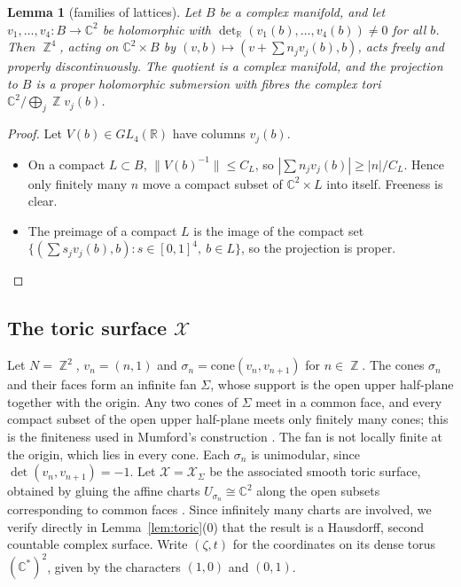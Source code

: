 \documentclass{article}
\DeclareMathOperator{\Z}{\mathbb{Z}}
\newtheorem{lemma}[theorem]{Lemma}
\theoremstyle{definition}
\theoremstyle{plain}
\newcommand{\R}{\mathbb{R}}
\newcommand{\C}{\mathbb{C}}
\newcommand{\cX}{\mathcal{X}}
\begin{document}
\begin{lemma}[families of lattices]\label{lem:latticefamily}
Let $B$ be a complex manifold, and let $v_1,\dots,v_4\colon B\to\C^2$ be holomorphic with
$\det_\R(v_1(b),\dots,v_4(b))\neq0$ for all $b$. Then $\Z^4$, acting on $\C^2\times B$ by
$(v,b)\mapsto(v+\sum n_jv_j(b),b)$, acts freely and properly discontinuously. The
quotient is a complex manifold, and the projection to $B$ is a proper holomorphic
submersion with fibres the complex tori $\C^2/\bigoplus_j\Z v_j(b)$.
\end{lemma}
\begin{proof}
Let $V(b)\in GL_4(\R)$ have columns $v_j(b)$.
\begin{itemize}
\item On a compact $L\subset B$, $\|V(b)^{-1}\|\le C_L$, so
  $|\sum n_jv_j(b)|\ge |n|/C_L$. Hence only finitely many $n$ move a compact subset of
  $\C^2\times L$ into itself. Freeness is clear.
\item The preimage of a compact $L$ is the image of the compact set
  $\{(\sum s_jv_j(b),b): s\in[0,1]^4,\ b\in L\}$, so the projection is proper.
\end{itemize}
\end{proof}

\subsection{The toric surface $\cX$}\label{sec:toric}
Let $N=\Z^2$, $v_n=(n,1)$ and $\sigma_n=\mathrm{cone}(v_n,v_{n+1})$ for $n\in\Z$. The
cones $\sigma_n$ and their faces form an infinite fan $\Sigma$, whose support is the
open upper half-plane together with the origin. Any two cones of $\Sigma$ meet in a
common face, and every compact subset of the open upper half-plane meets only finitely
many cones; this is the finiteness used in Mumford's construction \cite{Mumford72}. The
fan is not locally finite at the origin, which lies in every cone. Each
$\sigma_n$ is unimodular, since $\det(v_n,v_{n+1})=-1$. Let $\cX=\cX_\Sigma$ be the
associated smooth toric surface, obtained by gluing the affine charts
$U_{\sigma_n}\cong\C^2$ along the open subsets corresponding to common faces
\cite{Fulton93}. Since infinitely many charts are involved, we verify directly in
Lemma~\ref{lem:toric}(0) that the result is a Hausdorff, second countable complex
surface. Write $(\zeta,t)$ for the coordinates on its dense torus
$(\C^*)^2$, given by the characters $(1,0)$ and $(0,1)$.
\end{document}
